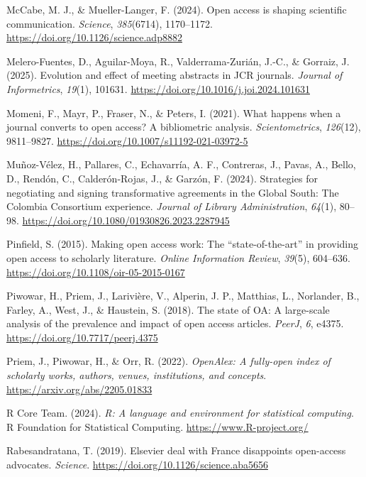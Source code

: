 \documentclass[a4paper,man,floatsintext,longtable,noextraspace,10pt]{apa6}
\newlength{\cslhangindent}
\newenvironment{CSLReferences}[2] %
{\begin{list}{}{%
  \setlength{\itemindent}{0pt}
  \setlength{\leftmargin}{0pt}
  \setlength{\parsep}{0pt}
  \ifodd #1
  \setlength{\leftmargin}{\cslhangindent}
  \setlength{\itemindent}{-1\cslhangindent}
  \fi
  \setlength{\itemsep}{#2\baselineskip}}}
{\end{list}}
\begin{document}
\begin{CSLReferences}{1}{0}
McCabe, M. J., \& Mueller-Langer, F. (2024). Open access is shaping
scientific communication. \emph{Science}, \emph{385}(6714), 1170--1172.
\url{https://doi.org/10.1126/science.adp8882}

Melero-Fuentes, D., Aguilar-Moya, R., Valderrama-Zurián, J.-C., \&
Gorraiz, J. (2025). Evolution and effect of meeting abstracts in JCR
journals. \emph{Journal of Informetrics}, \emph{19}(1), 101631.
\url{https://doi.org/10.1016/j.joi.2024.101631}

Momeni, F., Mayr, P., Fraser, N., \& Peters, I. (2021). What happens
when a journal converts to open access? A bibliometric analysis.
\emph{Scientometrics}, \emph{126}(12), 9811--9827.
\url{https://doi.org/10.1007/s11192-021-03972-5}

Muñoz-Vélez, H., Pallares, C., Echavarría, A. F., Contreras, J., Pavas,
A., Bello, D., Rendón, C., Calderón-Rojas, J., \& Garzón, F. (2024).
Strategies for negotiating and signing transformative agreements in the
{Global South}: The {Colombia Consortium} experience. \emph{Journal of
Library Administration}, \emph{64}(1), 80--98.
\url{https://doi.org/10.1080/01930826.2023.2287945}

Pinfield, S. (2015). Making open access work: The {``state-of-the-art''}
in providing open access to scholarly literature. \emph{Online
Information Review}, \emph{39}(5), 604--636.
\url{https://doi.org/10.1108/oir-05-2015-0167}

Piwowar, H., Priem, J., Larivière, V., Alperin, J. P., Matthias, L.,
Norlander, B., Farley, A., West, J., \& Haustein, S. (2018). The state
of {OA}: A large-scale analysis of the prevalence and impact of open
access articles. \emph{{PeerJ}}, \emph{6}, e4375.
\url{https://doi.org/10.7717/peerj.4375}

Priem, J., Piwowar, H., \& Orr, R. (2022). \emph{OpenAlex: A fully-open
index of scholarly works, authors, venues, institutions, and concepts}.
\url{https://arxiv.org/abs/2205.01833}

R Core Team. (2024). \emph{R: A language and environment for statistical
computing}. R Foundation for Statistical Computing.
\url{https://www.R-project.org/}

Rabesandratana, T. (2019). Elsevier deal with {France} disappoints
open-access advocates. \emph{Science}.
\url{https://doi.org/10.1126/science.aba5656}


\end{CSLReferences}
\end{document}
